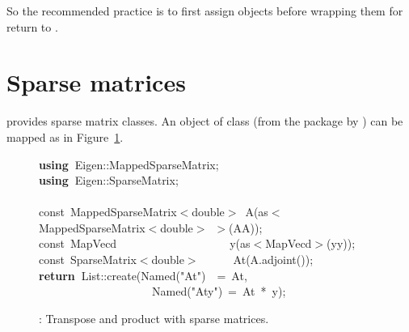 \documentclass[shortnames,article,nojss]{jss}
\newcommand{\hlstd}[1]{\textcolor[rgb]{0,0,0}{#1}}
\newcommand{\hlopt}[1]{\textcolor[rgb]{0,0,0}{#1}}
\newcommand{\hlstr}[1]{\textcolor[rgb]{0.90,0.15,0.15}{#1}}
\newcommand{\hlkwa}[1]{\textcolor[rgb]{0.61,0.13,0.93}{\bf{#1}}}
\newcommand{\hlkwb}[1]{\textcolor[rgb]{0.13,0.54,0.13}{#1}}
\newcommand{\hlkwd}[1]{\textcolor[rgb]{0,0,0}{#1}}
\begin{document}
So the recommended practice is to first assign objects before wrapping them
for return to .

\section{Sparse matrices}
\label{sec:sparse}

 provides sparse matrix classes.  An  object of
class  (from the  package by
\citet{CRAN:Matrix}) can be mapped as in Figure~\ref{sparseProd}.

\begin{figure}[htb]
  \noindent
  \ttfamily
  \hlstd{}\hlkwa{using\ }\hlstd{Eigen}\hlopt{::}\hlstd{MappedSparseMatrix}\hlopt{;}\hspace*{\fill}\\
  \hlstd{}\hlkwa{using\ }\hlstd{Eigen}\hlopt{::}\hlstd{SparseMatrix}\hlopt{;}\hspace*{\fill}\\
  \hlstd{}\hspace*{\fill}\\
  \hlkwb{const\ }\hlstd{MappedSparseMatrix}\hlopt{$<$}\hlstd{}\hlkwb{double}\hlstd{}\hlopt{$>$\ }\hlstd{}\hlkwd{A}\hlstd{}\hlopt{(}\hlstd{as}\hlopt{$<$}\hlstd{MappedSparseMatrix}\hlopt{$<$}\hlstd{}\hlkwb{double}\hlstd{}\hlopt{$>$\ $>$(}\hlstd{AA}\hlopt{));}\hspace*{\fill}\\
  \hlstd{}\hlkwb{const\ }\hlstd{MapVecd}\hlstd{\ \ \ \ \ \ \ \ \ \ \ \ \ \ \ \ \ \ \ \ }\hlstd{}\hlkwd{y}\hlstd{}\hlopt{(}\hlstd{as}\hlopt{$<$}\hlstd{MapVecd}\hlopt{$>$(}\hlstd{yy}\hlopt{));}\hspace*{\fill}\\
  \hlstd{}\hlkwb{const\ }\hlstd{SparseMatrix}\hlopt{$<$}\hlstd{}\hlkwb{double}\hlstd{}\hlopt{$>$}\hlstd{\ \ \ \ \ \ }\hlopt{}\hlstd{}\hlkwd{At}\hlstd{}\hlopt{(}\hlstd{A}\hlopt{.}\hlstd{}\hlkwd{adjoint}\hlstd{}\hlopt{());}\hspace*{\fill}\\
  \hlstd{}\hlkwa{return\ }\hlstd{List}\hlopt{::}\hlstd{}\hlkwd{create}\hlstd{}\hlopt{(}\hlstd{Named}\hlopt{{(}}\hlstd{}\hlstr{"At"}\hlstd{}\hlopt{{)}}\hlstd{\ \ }\hlopt{=\ }\hlstd{At}\hlopt{,}\hspace*{\fill}\\
  \hlstd{}\hlstd{\ \ \ \ \ \ \ \ \ \ \ \ \ \ \ \ \ \ \ \ }\hlstd{Named}\hlopt{{(}}\hlstd{}\hlstr{"Aty"}\hlstd{}\hlopt{{)}\ =\ }\hlstd{At\ }\hlopt{{*}\ }\hlstd{y}\hlopt{);}\hlstd{}\hspace*{\fill}\\
  \mbox{}
  \normalfont
  \normalsize
  \caption{: Transpose and product with sparse matrices.}
  \label{sparseProd}
\end{figure}
\end{document}

